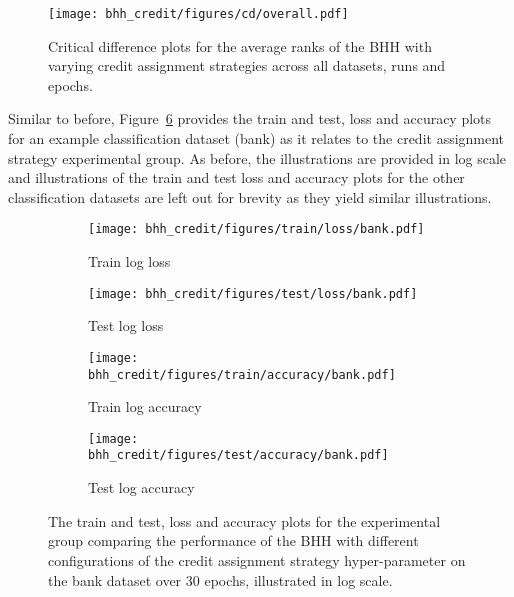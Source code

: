 \begin{figure}[htb]
      \centering
      \texttt{[image: bhh\_credit/figures/cd/overall.pdf]}
      \caption{Critical difference plots for the average ranks of the \acs{BHH} with varying credit assignment strategies across all datasets, runs and epochs.}
      \label{fig:results:credit:descriptive:cd}
\end{figure}

Similar to before, Figure~\ref{fig:results:credit:figures:bank} provides the train and test, loss and accuracy plots for an example classification dataset (bank) as it relates to the credit assignment strategy experimental group. As before, the illustrations are provided in log scale and illustrations of the train and test loss and accuracy plots for the other classification datasets are left out for brevity as they yield similar illustrations.


\begin{figure}[htbp]
      \begin{subfigure}{0.5\textwidth}
            \centering
            \texttt{[image: bhh\_credit/figures/train/loss/bank.pdf]}
            \caption{Train log loss}
            \label{fig:results:credit:figures:loss:train:bank}
      \end{subfigure}
      \begin{subfigure}{0.5\textwidth}
            \centering
            \texttt{[image: bhh\_credit/figures/test/loss/bank.pdf]}
            \caption{Test log loss}
            \label{fig:results:credit:figures:loss:test:bank}
      \end{subfigure}
      \par\bigskip
      \begin{subfigure}{0.5\textwidth}
            \centering
            \texttt{[image: bhh\_credit/figures/train/accuracy/bank.pdf]}
            \caption{Train log accuracy}
            \label{fig:results:credit:figures:accuracy:train:bank}
      \end{subfigure}
      \begin{subfigure}{0.5\textwidth}
            \centering
            \texttt{[image: bhh\_credit/figures/test/accuracy/bank.pdf]}
            \caption{Test log accuracy}
            \label{fig:results:credit:figures:accuracy:test:bank}
      \end{subfigure}
      \par\bigskip
      \caption{The train and test, loss and accuracy plots for the experimental group comparing the performance of the \acs{BHH} with different configurations of the credit assignment strategy hyper-parameter on the bank dataset over 30 epochs, illustrated in log scale.}
      \label{fig:results:credit:figures:bank}
\end{figure}

